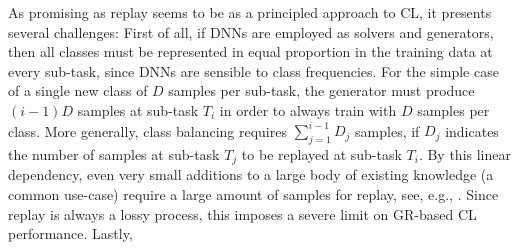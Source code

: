 \documentclass{article} %
\begin{document}
%
As promising as replay seems to be as a principled approach to CL, it presents several challenges: 
First of all, if DNNs are employed as solvers and generators, then all classes must be represented in equal proportion in the training data at every sub-task, since DNNs are sensible to class frequencies. 
For the simple case of a single new class of $D$ samples per sub-task, the generator must produce $(i-1)D$ samples at sub-task $T_i$ in order to always train with $D$ samples per class. More generally, class balancing requires $\sum_{j=1}^{i-1} D_j$ samples, if $D_j$ indicates the number of samples at sub-task $T_j$ to be replayed at sub-task $T_i$.
By this linear dependency, even very small additions to a large body of existing knowledge (a common use-case) require a large amount of samples for replay, see, e.g., \cite{nadz22}. Since replay is always a lossy process, this imposes a severe limit on GR-based CL performance.
%
Lastly, 
%
\end{document}
